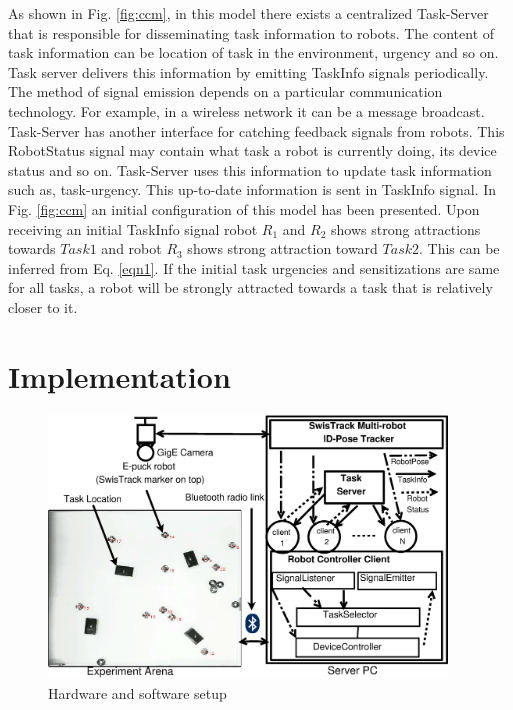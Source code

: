\documentclass{llncs}
\begin{document}
As shown in Fig. \ref{fig:ccm}, in this model there exists a centralized Task-Server that is responsible for disseminating task information to robots. The content of  task information can be   location of task in the environment, urgency and so on. Task server delivers this information by emitting TaskInfo signals periodically. The method of signal emission depends on a particular communication technology. For example, in a wireless network it can be a message broadcast.
Task-Server has another interface for catching feedback signals from robots. This RobotStatus signal may contain what task a robot is currently doing, its device status and so on.  Task-Server  uses this information to update task information such as, task-urgency. This up-to-date information is sent in TaskInfo signal.
In Fig. \ref{fig:ccm} an initial configuration of this model has been presented. Upon receiving an initial TaskInfo signal robot $R_1$ and $R_2$ shows  strong attractions towards $Task1$ and robot $R_3$ shows strong attraction toward $Task2$. This can be inferred from Eq. \ref{eqn1}. If the initial task urgencies and sensitizations are same for all tasks, a robot will be strongly attracted towards a task that is relatively closer to it.

\section{Implementation}
\label{sec:impl}
\begin{figure}
\centering
\includegraphics[height=7cm,  angle=0]
{../dia-files/RIL-Expt-Setup1.eps}
\caption{\small Hardware and software setup}
\label{fig:g1} %
\end{figure}
\end{document}
